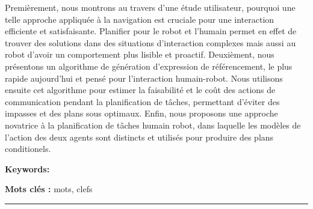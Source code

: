 \documentclass[english,a4paper,11pt,twoside]{StyleThese}
\begin{document}
\begin{vcenterpage}
Premièrement, nous montrons au travers d'une étude utilisateur, pourquoi une telle approche appliquée à la navigation est cruciale pour une interaction efficiente et satisfaisante. Planifier pour le robot et l'humain permet en effet de trouver des solutions dans des situations d'interaction complexes mais aussi au robot d'avoir un comportement plus lisible et proactif. Deuxièment, nous présentons un algorithme de génération d'expression de référencement, le plus rapide aujourd'hui et pensé pour l'interaction humain-robot. Nous utilisons ensuite cet algorithme pour estimer la faisabilité et le coût des actions de communication pendant la planification de tâches, permettant d'éviter des impasses et des plans sous optimaux. Enfin, nous proposons une approche novatrice à la planification de tâches humain robot, dans laquelle les modèles de l'action des deux agents sont distincts et utilisés pour produire des plans conditionels.

\textbf{Keywords:}

\textbf{Mots clés :}
mots, clefs
\\
\noindent\rule[2pt]{\textwidth}{0.5pt}
\end{vcenterpage}
\end{document}
